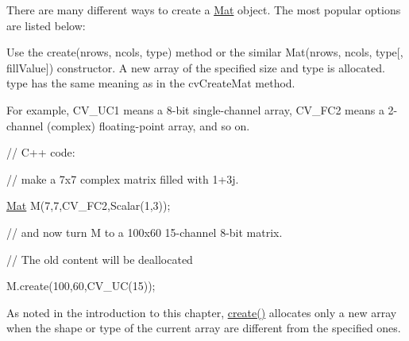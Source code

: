 There are many different ways to create a {\ttfamily \mbox{\hyperlink{classorg_1_1opencv_1_1core_1_1_mat}{Mat}}} object. The most popular options are listed below\+:


\begin{DoxyItemize}
\item Use the {\ttfamily create(nrows, ncols, type)} method or the similar {\ttfamily Mat(nrows, ncols, type\mbox{[}, fill\+Value\mbox{]})} constructor. A new array of the specified size and type is allocated. {\ttfamily type} has the same meaning as in the {\ttfamily cv\+Create\+Mat} method. 
\end{DoxyItemize}

For example, {\ttfamily C\+V\+\_\+U\+C1} means a 8-\/bit single-\/channel array, {\ttfamily C\+V\+\_\+F\+C2} means a 2-\/channel (complex) floating-\/point array, and so on.

{\ttfamily }

{\ttfamily }

{\ttfamily }

{\ttfamily // C++ code\+:}

{\ttfamily }

{\ttfamily }

{\ttfamily // make a 7x7 complex matrix filled with 1+3j.}

{\ttfamily }

{\ttfamily }

{\ttfamily \mbox{\hyperlink{classorg_1_1opencv_1_1core_1_1_mat}{Mat}} M(7,7,\+C\+V\+\_\+F\+C2,\+Scalar(1,3));}

{\ttfamily }

{\ttfamily }

{\ttfamily // and now turn M to a 100x60 15-\/channel 8-\/bit matrix.}

{\ttfamily }

{\ttfamily }

{\ttfamily // The old content will be deallocated}

{\ttfamily }

{\ttfamily }

{\ttfamily M.\+create(100,60,\+C\+V\+\_\+U\+C(15));}

{\ttfamily }

{\ttfamily }

{\ttfamily }

As noted in the introduction to this chapter, {\ttfamily \mbox{\hyperlink{classorg_1_1opencv_1_1core_1_1_mat_a539b0a3690afb6b43047b50cbb787fee}{create()}}} allocates only a new array when the shape or type of the current array are different from the specified ones.



